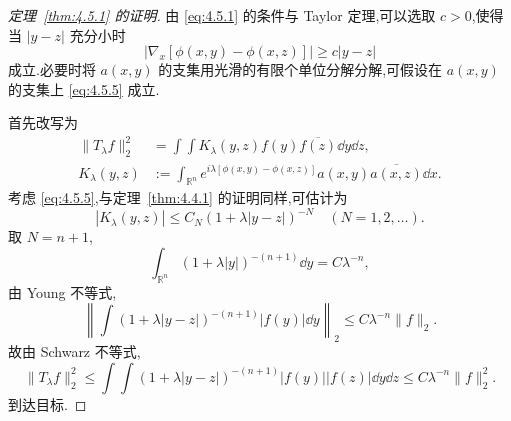 \begin{proof}[定理~\ref{thm:4.5.1} 的证明]
由 \eqref{eq:4.5.1} 的条件与 Taylor 定理,可以选取 $c > 0$,使得当 $|y - z|$ 充分小时
\begin{equation}
|\nabla_{x}[\phi(x, y) - \phi(x, z)]| \geq c|y - z|\tag{4.5.5}
\label{eq:4.5.5}\end{equation}
成立.必要时将 $a(x, y)$ 的支集用光滑的有限个单位分解分解,可假设在 $a(x, y)$ 的支集上 \eqref{eq:4.5.5} 成立.

首先改写为
\begin{equation}
\begin{aligned}
\|T_{\lambda}f\|_{2}^{2} & = \int\int K_{\lambda}(y, z)f(y)\overline{f(z)}\dd y\dd z, \\
K_{\lambda}(y, z) & := \int_{\mathbb{R}^{n}}e^{i\lambda[\phi(x, y) - \phi(x, z)]}a(x, y)\overline{a(x, z)}\dd x.
\end{aligned}
\end{equation}
考虑 \eqref{eq:4.5.5},与定理~\ref{thm:4.4.1} 的证明同样,可估计为
\begin{equation*}
|K_{\lambda}(y, z)| \leq C_{N}(1 + \lambda|y - z|)^{-N} \quad (N = 1, 2, \ldots).
\end{equation*}
取 $N = n + 1$,
\begin{equation*}
\int_{\mathbb{R}^{n}}(1 + \lambda|y|)^{-(n+1)}\dd y = C\lambda^{-n},
\end{equation*}
由 Young 不等式,
\begin{equation*}
\left\|\int(1 + \lambda|y - z|)^{-(n+1)}|f(y)|\dd y\right\|_{2} \leq C\lambda^{-n}\|f\|_{2}.
\end{equation*}
故由 Schwarz 不等式,
\begin{equation*}
\|T_{\lambda}f\|_{2}^{2} \leq \int\int(1 + \lambda|y - z|)^{-(n+1)}|f(y)||f(z)|\dd y\dd z \leq C\lambda^{-n}\|f\|_{2}^{2}.
\end{equation*}
到达目标.
\end{proof}
